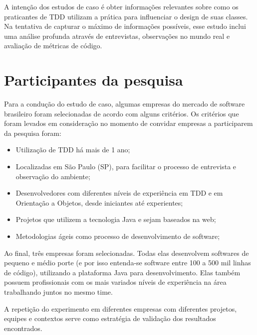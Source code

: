 A intenção dos estudos de caso é obter informações relevantes sobre como os
praticantes de TDD utilizam a prática para influenciar o design de suas
classes. Na tentativa de capturar o máximo de informações possíveis, esse estudo
inclui uma análise profunda através de entrevistas, observações no mundo real e 
avaliação de métricas de código.

\section{Participantes da pesquisa}
\label{sec:planejamento-participantes}

Para a condução do estudo de caso, algumas empresas do mercado de software
brasileiro foram selecionadas de acordo com alguns critérios.
Os critérios que foram levados em consideração no momento de convidar empresas a
participarem da pesquisa foram:

\begin{itemize}
	\item Utilização de TDD há mais de 1 ano;

	\item Localizadas em São Paulo (SP), para facilitar o processo de
	entrevista e observação do ambiente;

	\item Desenvolvedores com diferentes níveis de experiência em TDD e em 
	Orientação a Objetos, desde iniciantes até experientes;

	\item Projetos que utilizem a tecnologia Java e sejam baseados na web;

	\item Metodologias ágeis como processo de desenvolvimento de
	software;
\end{itemize}

Ao final, três empresas foram selecionadas. Todas elas desenvolvem softwares de
pequeno e médio porte (e por isso entenda-se software entre 100 a 500 mil linhas
de código), utilizando a plataforma Java para desenvolvimento. Elas também 
possuem profissionais com os mais variados níveis de experiência na área 
trabalhando juntos no mesmo time.

A repetição do experimento em diferentes empresas com diferentes projetos,
equipes e contextos serve como estratégia de validação dos resultados
encontrados.

